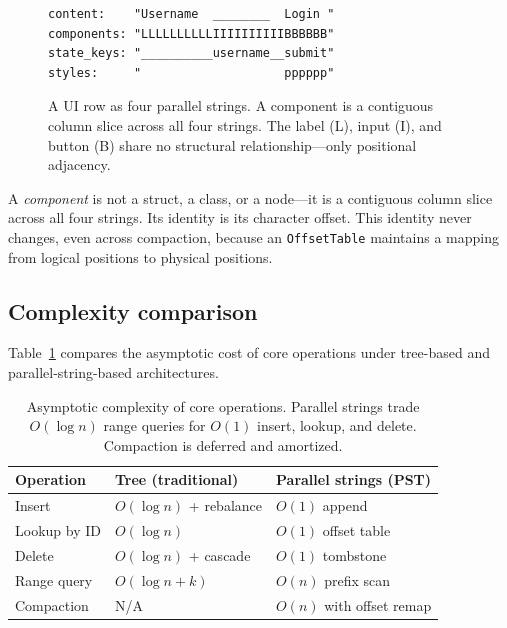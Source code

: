 \documentclass[11pt,a4paper]{article}
\begin{document}
\begin{figure}[h]
\centering
\begin{lstlisting}[numbers=none]
content:    "Username  ________  Login "
components: "LLLLLLLLLLIIIIIIIIIIBBBBBB"
state_keys: "__________username__submit"
styles:     "                    pppppp"
\end{lstlisting}
\caption{A UI row as four parallel strings. A component is a contiguous column slice across all four strings. The label (L), input (I), and button (B) share no structural relationship---only positional adjacency.}
\label{fig:parallel}
\end{figure}

A \emph{component} is not a struct, a class, or a node---it is a contiguous column slice across all four strings. Its identity is its character offset. This identity never changes, even across compaction, because an \texttt{OffsetTable} maintains a mapping from logical positions to physical positions.

\subsection{Complexity comparison}

Table~\ref{tab:complexity} compares the asymptotic cost of core operations under tree-based and parallel-string-based architectures.

\begin{table}[h]
\centering
\begin{tabular}{lll}
\toprule
\textbf{Operation} & \textbf{Tree (traditional)} & \textbf{Parallel strings (PST)} \\
\midrule
Insert         & $O(\log n)$ + rebalance    & $O(1)$ append \\
Lookup by ID   & $O(\log n)$                & $O(1)$ offset table \\
Delete         & $O(\log n)$ + cascade      & $O(1)$ tombstone \\
Range query    & $O(\log n + k)$            & $O(n)$ prefix scan \\
Compaction     & N/A                        & $O(n)$ with offset remap \\
\bottomrule
\end{tabular}
\caption{Asymptotic complexity of core operations. Parallel strings trade $O(\log n)$ range queries for $O(1)$ insert, lookup, and delete. Compaction is deferred and amortized.}
\label{tab:complexity}
\end{table}
\end{document}
